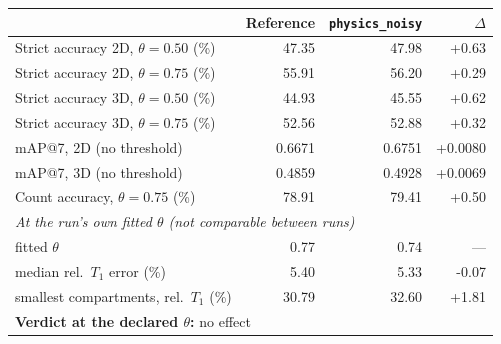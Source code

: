 \renewcommand{\arraystretch}{1.05}
\begin{tabular}{lrrr}
\toprule
 & Reference & \texttt{physics\_noisy} & $\Delta$ \\
\midrule
Strict accuracy 2D, $\theta = 0.50$ (\%) & 47.35 & 47.98 & +0.63 \\
Strict accuracy 2D, $\theta = 0.75$ (\%) & 55.91 & 56.20 & +0.29 \\
Strict accuracy 3D, $\theta = 0.50$ (\%) & 44.93 & 45.55 & +0.62 \\
Strict accuracy 3D, $\theta = 0.75$ (\%) & 52.56 & 52.88 & +0.32 \\
\midrule
mAP@7, 2D (no threshold) & 0.6671 & 0.6751 & +0.0080 \\
mAP@7, 3D (no threshold) & 0.4859 & 0.4928 & +0.0069 \\
\midrule
Count accuracy, $\theta = 0.75$ (\%) & 78.91 & 79.41 & +0.50 \\
\midrule
\multicolumn{4}{l}{\emph{At the run's own fitted $\theta$ (not comparable between runs)}} \\
\quad fitted $\theta$ & 0.77 & 0.74 & --- \\
\quad median rel.\ $T_1$ error (\%) & 5.40 & 5.33 & -0.07 \\
\quad smallest compartments, rel.\ $T_1$ (\%) & 30.79 & 32.60 & +1.81 \\
\midrule
\multicolumn{4}{l}{\textbf{Verdict at the declared $\theta$:} no effect} \\
\bottomrule
\end{tabular}
